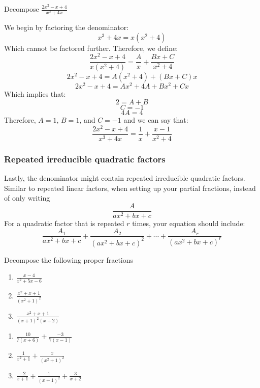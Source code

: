 \begin{Worked}
\begin{Problem}
Decompose $\frac{2x^2 - x + 4}{x^3 + 4x}$
\end{Problem}
\begin{Solution}
We begin by factoring the denominator:
$$x^3 + 4x = x(x^2 + 4)$$
Which cannot be factored further. Therefore, we define:
$$\frac{2x^2 - x + 4}{x(x^2 + 4)} = \frac{A}{x} + \frac{Bx + C}{x^2 + 4}$$
$$2x^2 - x + 4 = A(x^2 + 4) + (Bx + C)x$$
$$2x^2 - x + 4 = Ax^2 + 4A + Bx^2 + Cx$$
Which implies that:
$$2 = A + B$$
$$C = -1$$
$$4A = 4$$
Therefore, $A = 1$, $B = 1$, and $C = -1$ and we can say that:
$$\frac{2x^2 - x + 4}{x^3 + 4x} = \frac{1}{x} + \frac{x - 1}{x^2 + 4}$$
\end{Solution}
\end{Worked}

\subsubsection{Repeated irreducible quadratic factors}
Lastly, the denominator might contain repeated irreducible quadratic factors. 
Similar to repeated linear factors, when setting up your partial fractions, 
instead of only writing 
$$\frac{A}{ax^2 + bx + c}$$
For a quadratic factor that is repeated $r$ times, your equation should include:
$$\frac{A_1}{ax^2 + bx + c} + \frac{A_2}{(ax^2 + bx + c)^2} + \cdots + 
\frac{A_r}{(ax^2 + bx + c)^r}$$

\begin{Exercise}[label = proper]
Decompose the following proper fractions
\begin{enumerate}
\item $\frac{x - 4}{x^2 + 5x - 6}$
\item $\frac{x^2 + x + 1}{(x^2 + 1)^2}$
\item $\frac{x^2 + x + 1}{(x + 1)^2 (x + 2)}$
\end{enumerate}
\end{Exercise}

\begin{Answer}[ref = proper]
\begin{enumerate}
\item $\frac{10}{7(x + 6)} + \frac{-3}{7(x - 1)}$
\item $\frac{1}{x^2 + 1} + \frac{x}{(x^2 + 1)^2}$
\item $\frac{-2}{x + 1} + \frac{1}{(x + 1)^2} + \frac{3}{x + 2}$
\end{enumerate}
\end{Answer}
